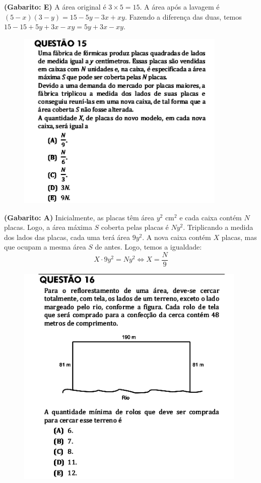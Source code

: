 \documentclass[a4paper]{article}
\begin{document}
\par\textbf{(Gabarito: E)} A área original é $3\times 5 = 15$. A área após a lavagem é $(5-x)(3-y) = 15 - 5y - 3x + xy$. Fazendo a diferença das duas, temos $15 - 15 + 5y + 3x - xy = 5y + 3x - xy$.
\begin{figure}[H]
	\begin{center}
		\includegraphics[width=10cm]{L5Q15.png}
	\end{center}
\end{figure}
\par\textbf{(Gabarito: A)} Inicialmente, as placas têm área $y^2$ cm$^2$ e cada caixa contém $N$ placas. Logo, a área máxima $S$ coberta pelas placas é $Ny^2$. Triplicando a medida dos lados das placas, cada uma terá área $9y^2$. A nova caixa contém $X$ placas, mas que ocupam a mesma área $S$ de antes. Logo, temos a igualdade:
\begin{equation*}
X\cdot 9y^2 = Ny^2 \iff X = \frac{N}{9}
\end{equation*}
\begin{figure}[H]
	\begin{center}
		\includegraphics[width=11cm]{L5Q16.png}
	\end{center}
\end{figure}
\end{document}
